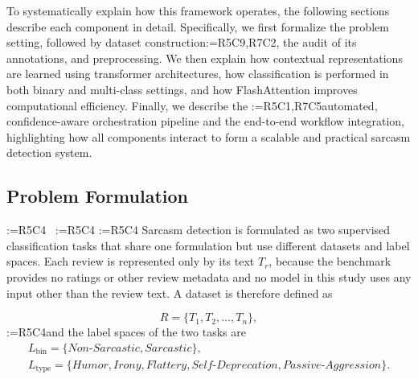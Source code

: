 \documentclass[a4paper,fleqn]{cas-sc}
\makeatletter
\newif\iftracked
\newcommand{\rv@setcolour}[1]{%
  \IfStrEq{#1}{R7C7}{\color{rvEdit}}{%
    \IfSubStr{#1}{R5}{\IfSubStr{#1}{R7}{\color{rvBoth}}{\color{rvFive}}}{\color{rvSeven}}}}
\newcommand{\rv@tag}[1]{\textsuperscript{\sffamily\bfseries\scriptsize[\StrSubstitute{#1}{,}{, }]}\,}
\newcommand{\rv@recordone}[1]{%
  \edef\rv@i{#1}%
  \ifcsdef{rv@n@\rv@i}{}{\csgdef{rv@n@\rv@i}{0}}%
  \csxdef{rv@n@\rv@i}{\the\numexpr\csuse{rv@n@\rv@i}+1\relax}%
  \begingroup\edef\@currentlabel{\rv@i}\label{rv:\rv@i:\csuse{rv@n@\rv@i}}\endgroup}
\newcommand{\rv@record}[1]{\@for\rv@id:=#1\do{\expandafter\rv@recordone\expandafter{\rv@id}}}
\DeclareRobustCommand{\rc}[2]{\rv@record{#1}\iftracked{\rv@setcolour{#1}\rv@tag{#1}#2}\else#2\fi}
\DeclareRobustCommand{\rcdel}[2]{\rv@record{#1}\iftracked{\rv@setcolour{#1}\rv@tag{#1}\rv@strike{#2}}\else\unskip\fi}
\DeclareRobustCommand{\rcrep}[3]{\rv@record{#1}\iftracked{\rv@setcolour{#1}\rv@tag{#1}\rv@strike{#2} #3}\else#3\fi}
\DeclareRobustCommand{\rcm}[2]{\iftracked{\rv@setcolour{#1}#2}\else#2\fi}
\DeclareRobustCommand{\rvstrikeplain}[1]{\rv@strike{#1}}
\newenvironment{rcblock}[1]{\rv@record{#1}\iftracked\rv@setcolour{#1}\leavevmode\rv@tag{#1}\fi\ignorespaces}{\par}
\makeatother
\begin{document}
To systematically explain how this framework operates, the following sections describe each component in detail. Specifically, we first formalize the problem setting, followed by dataset construction\rc{R5C9,R7C2}{, the audit of its annotations,} and preprocessing. We then explain how contextual representations are learned using transformer architectures, how classification is performed in both binary and multi-class settings, and how FlashAttention improves computational efficiency. Finally, we describe the \rcrep{R5C1,R7C5}{agentic AI pipeline}{automated, confidence-aware orchestration pipeline} and the end-to-end workflow integration, highlighting how all components interact to form a scalable and practical sarcasm detection system.

\subsection{Problem Formulation}
\label{sec:formulation}
\rcdel{R5C4}{Sarcasm detection is formulated as a supervised multi-class classification problem. Each review is represented as} \iftracked{\color{rvFive}\mbox{\rvstrikeplain{$r=\langle{T_r},{C_r}\rangle$.}}}\fi\ \rcdel{R5C4}{According to Equation (1), $T_r$ represents the textual content of the review, while $C_r$ denotes optional contextual information such as ratings or metadata. This formulation enables the model to incorporate both linguistic and contextual cues. The dataset is defined as $R=\{r_1,\ldots,r_n\}$ and the label space is formally defined in Equation (3) as $L=\{l_1,\ldots,l_k\}$.}
\begin{rcblock}{R5C4}
Sarcasm detection is formulated as two supervised classification tasks that share one formulation but use different datasets and label spaces. Each review is represented only by its text $T_r$, because the benchmark provides no ratings or other review metadata and no model in this study uses any input other than the review text. A dataset is therefore defined as
\end{rcblock}
\begin{equation}
\rcm{R5C4}{R = \{T_{1}, T_{2}, \ldots, T_{n}\},}
\label{eq:dataset}
\end{equation}
\rc{R5C4}{and the label spaces of the two tasks are}
\begin{equation}
\begin{gathered}
\rcm{R5C4}{L_{\mathrm{bin}} = \{\textit{Non-Sarcastic}, \textit{Sarcastic}\},} \\
\rcm{R5C4}{L_{\mathrm{type}} = \{\textit{Humor}, \textit{Irony}, \textit{Flattery}, \textit{Self-Deprecation}, \textit{Passive-Aggression}\}.}
\end{gathered}
\label{eq:labels}
\end{equation}
\end{document}
